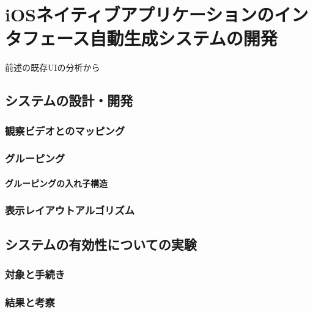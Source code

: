 \chapter{iOSネイティブアプリケーションのインタフェース自動生成システムの開発}
\label{chap:impl}
前述の既存UIの分析から
\section{システムの設計・開発}

\subsection{観察ビデオとのマッピング}

\subsection{グルーピング}
\subsubsection{グルーピングの入れ子構造}

\subsection{表示レイアウトアルゴリズム}

\section{システムの有効性についての実験}

\subsection{対象と手続き}

\subsection{結果と考察}